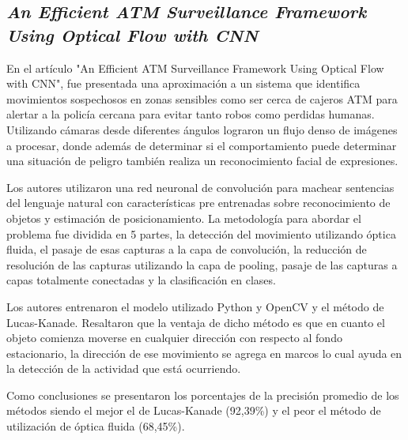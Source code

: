 \subsection{
    \textbf{\emph{An Efficient ATM Surveillance
            Framework Using Optical Flow
            with CNN}
    }
}

En el artículo "An Efficient ATM Surveillance
Framework Using Optical Flow
with CNN"\cite[pág. 39]{chaudharyMicroservices2020}, fue presentada una aproximación a un sistema que identifica movimientos sospechosos en zonas sensibles como ser cerca de cajeros ATM para alertar a la policía cercana para evitar tanto robos como perdidas humanas.
Utilizando cámaras desde diferentes ángulos lograron un flujo denso de imágenes a procesar, donde además de determinar si el comportamiento puede determinar una situación de peligro también realiza un reconocimiento facial de expresiones.
\par

Los autores utilizaron una red neuronal de convolución para machear sentencias del lenguaje natural con
características pre entrenadas sobre reconocimiento de objetos y estimación de posicionamiento.
La metodología para abordar el problema fue dividida en 5 partes, la detección del movimiento utilizando óptica fluida, el pasaje de esas capturas a la capa de convolución, la reducción de resolución de las capturas utilizando la capa de pooling, pasaje de las capturas a capas totalmente conectadas y la clasificación en clases.
\par

Los autores entrenaron el modelo utilizado Python y OpenCV y el método de Lucas-Kanade.
Resaltaron que la ventaja de dicho método es que en cuanto el objeto comienza
moverse en cualquier dirección con respecto al fondo estacionario, la dirección de
ese movimiento se agrega en marcos lo cual ayuda en la detección de la actividad que está ocurriendo.
\par

Como conclusiones se presentaron los porcentajes de la precisión promedio de los métodos siendo el mejor el de Lucas-Kanade (92,39\%) y el peor el método de utilización de óptica fluida (68,45\%).
\par
